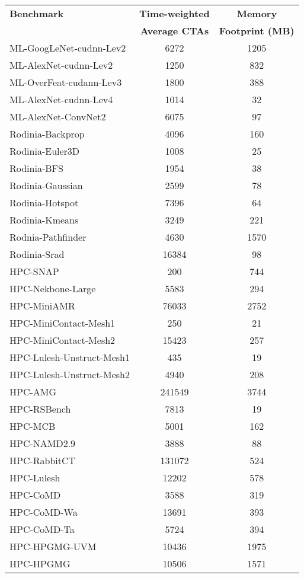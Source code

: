 \begin{table}[t]
\begin{small}
\centering
\begin{tabular}{lcc}
 \toprule
 \textbf{Benchmark} & \textbf{Time-weighted} & 
\textbf{Memory} \\
& \textbf{Average CTAs} & \textbf{Footprint (MB)} \\
 \toprule
ML-GoogLeNet-cudnn-Lev2 & 6272 & 1205 \\
ML-AlexNet-cudnn-Lev2 & 1250 & 832 \\
ML-OverFeat-cudann-Lev3 & 1800 & 388 \\
ML-AlexNet-cudnn-Lev4 & 1014 & 32 \\
ML-AlexNet-ConvNet2 & 6075 & 97 \\
Rodinia-Backprop & 4096 & 160 \\
Rodinia-Euler3D & 1008 & 25 \\
Rodinia-BFS  & 1954 & 38 \\
Rodinia-Gaussian  & 2599 & 78 \\
Rodinia-Hotspot  & 7396 & 64 \\
Rodinia-Kmeans  & 3249 & 221 \\
Rodnia-Pathfinder  & 4630 & 1570 \\
Rodinia-Srad  & 16384 & 98 \\
HPC-SNAP  & 200 & 744 \\
HPC-Nekbone-Large & 5583 & 294 \\
HPC-MiniAMR & 76033 & 2752 \\
HPC-MiniContact-Mesh1  & 250 & 21 \\
HPC-MiniContact-Mesh2  & 15423 & 257 \\
HPC-Lulesh-Unstruct-Mesh1  & 435 & 19 \\
HPC-Lulesh-Unstruct-Mesh2  & 4940 & 208 \\
HPC-AMG & 241549 & 3744 \\
HPC-RSBench  & 7813 & 19 \\
HPC-MCB  & 5001 & 162 \\
HPC-NAMD2.9  & 3888 & 88 \\
HPC-RabbitCT  & 131072 & 524 \\
HPC-Lulesh  & 12202 & 578 \\
HPC-CoMD  & 3588 & 319 \\
HPC-CoMD-Wa  & 13691 & 393 \\
HPC-CoMD-Ta  & 5724 & 394 \\
HPC-HPGMG-UVM  & 10436 & 1975 \\
HPC-HPGMG  & 10506 & 1571 \\

\end{tabular}
\end{small}
\end{table}
